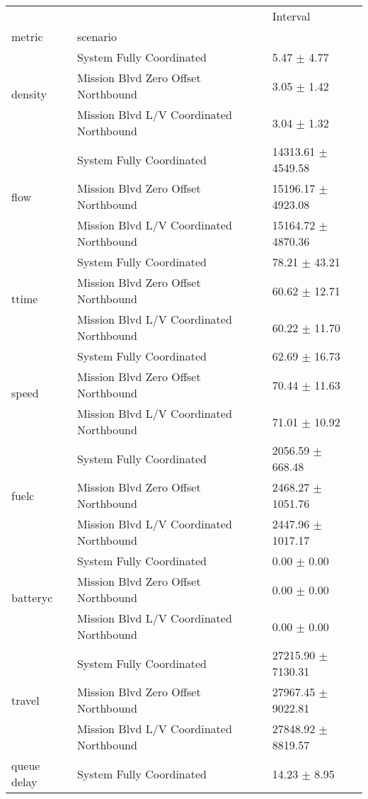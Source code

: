 \begin{tabular}{lll}
\toprule
 &  & Interval \\
metric & scenario &  \\
\midrule
\multirow[t]{3}{*}{density} & System Fully Coordinated & 5.47 $\pm$ 4.77 \\
 & Mission Blvd Zero Offset Northbound & 3.05 $\pm$ 1.42 \\
 & Mission Blvd L/V Coordinated Northbound & 3.04 $\pm$ 1.32 \\
\multirow[t]{3}{*}{flow} & System Fully Coordinated & 14313.61 $\pm$ 4549.58 \\
 & Mission Blvd Zero Offset Northbound & 15196.17 $\pm$ 4923.08 \\
 & Mission Blvd L/V Coordinated Northbound & 15164.72 $\pm$ 4870.36 \\
\multirow[t]{3}{*}{ttime} & System Fully Coordinated & 78.21 $\pm$ 43.21 \\
 & Mission Blvd Zero Offset Northbound & 60.62 $\pm$ 12.71 \\
 & Mission Blvd L/V Coordinated Northbound & 60.22 $\pm$ 11.70 \\
\multirow[t]{3}{*}{speed} & System Fully Coordinated & 62.69 $\pm$ 16.73 \\
 & Mission Blvd Zero Offset Northbound & 70.44 $\pm$ 11.63 \\
 & Mission Blvd L/V Coordinated Northbound & 71.01 $\pm$ 10.92 \\
\multirow[t]{3}{*}{fuelc} & System Fully Coordinated & 2056.59 $\pm$ 668.48 \\
 & Mission Blvd Zero Offset Northbound & 2468.27 $\pm$ 1051.76 \\
 & Mission Blvd L/V Coordinated Northbound & 2447.96 $\pm$ 1017.17 \\
\multirow[t]{3}{*}{batteryc} & System Fully Coordinated & 0.00 $\pm$ 0.00 \\
 & Mission Blvd Zero Offset Northbound & 0.00 $\pm$ 0.00 \\
 & Mission Blvd L/V Coordinated Northbound & 0.00 $\pm$ 0.00 \\
\multirow[t]{3}{*}{travel} & System Fully Coordinated & 27215.90 $\pm$ 7130.31 \\
 & Mission Blvd Zero Offset Northbound & 27967.45 $\pm$ 9022.81 \\
 & Mission Blvd L/V Coordinated Northbound & 27848.92 $\pm$ 8819.57 \\
\multirow[t]{3}{*}{queue delay} & System Fully Coordinated & 14.23 $\pm$ 8.95 \\

\end{tabular}
